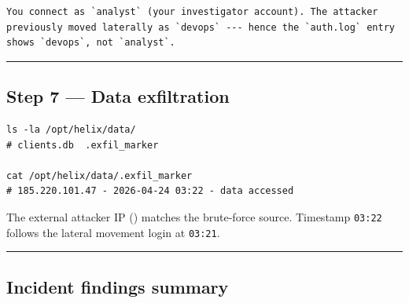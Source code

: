 \begin{lstlisting}
You connect as `analyst` (your investigator account). The attacker previously moved laterally as `devops` --- hence the `auth.log` entry shows `devops`, not `analyst`.
\end{lstlisting}

\begin{center}\rule{0.5\linewidth}{0.5pt}\end{center}

\subsection{Step 7 --- Data exfiltration}

\begin{lstlisting}
ls -la /opt/helix/data/
# clients.db  .exfil_marker

cat /opt/helix/data/.exfil_marker
# 185.220.101.47 - 2026-04-24 03:22 - data accessed
\end{lstlisting}

The external attacker IP () matches the brute-force source. Timestamp \texttt{03:22} follows the lateral movement login at \texttt{03:21}.

\begin{center}\rule{0.5\linewidth}{0.5pt}\end{center}

\subsection{Incident findings summary}

